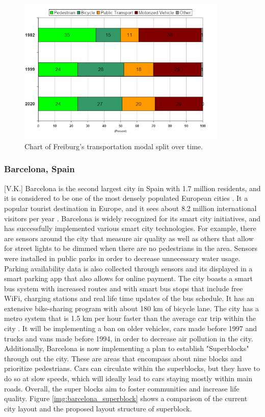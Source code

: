 \documentclass[12pt]{article}                       %
\begin{document}
\begin{figure}[H]
    \centering
    \includegraphics[width=10cm]{images/freiburg_modal_split.png}
    \caption{Chart of Freiburg's transportation modal split over time.}
    \label{img:freiburg_modal_split}
\end{figure}

\subsubsection{Barcelona, Spain}[V.K.]
Barcelona is the second largest city in Spain with 1.7 million residents, and it is considered to be one of the most densely populated European cities \cite{Bausells2016SuperblocksResidents}. It a popular tourist destination in Europe, and it sees about 8.2 million international visitors per year \cite{Bausells2016SuperblocksResidents}. Barcelona is widely recognized for its smart city initiatives, and has successfully implemented various smart city technologies. For example, there are sensors around the city that measure air quality as well as others that allow for street lights to be dimmed when there are no pedestrians in the area. Sensors were installed in public parks in order to decrease unnecessary water usage. Parking availability data is also collected through sensors and its displayed in a smart parking app that also allows for online payment. The city boasts a smart bus system with increased routes and with smart bus stops that include free WiFi, charging stations and real life time updates of the bus schedule. It has an extensive bike-sharing program with about 180 km of bicycle lane. The city has a metro system that is 1.5 km per hour faster than the average car trip within the city \cite{Bausells2016SuperblocksResidents}. It will be implementing a ban on older vehicles, cars made before 1997 and trucks and vans made before 1994, in order to decrease air pollution in the city. Additionally, Barcelona is now implementing a plan to establish "Superblocks" through out the city. These are areas that encompass about nine blocks and prioritize pedestrians. Cars can circulate within the superblocks, but they have to do so at slow speeds, which will ideally lead to cars staying mostly within main roads. Overall, the super blocks aim to foster communities and increase life quality. Figure \ref{img:barcelona_superblock} shows a comparison of the current city layout and the proposed layout structure of superblock.
\end{document}

